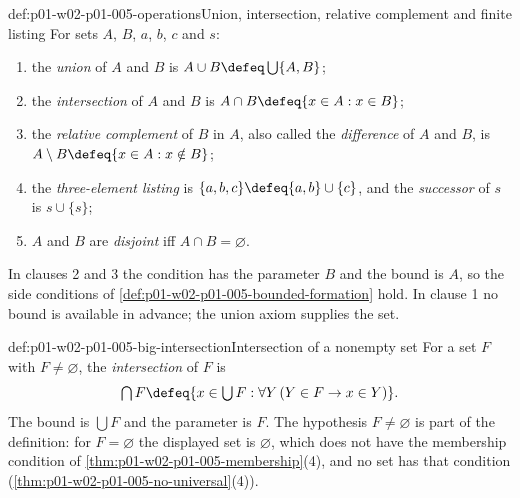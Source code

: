 \begin{hbdefinition}{def:p01-w02-p01-005-operations}{Union, intersection, relative complement and finite listing}
For sets \(A\), \(B\), \(a\), \(b\), \(c\) and \(s\):
\begin{enumerate}
  \item the \emph{union} of \(A\) and \(B\) is
        \(A\cup B\defeq\bigcup\{A,B\}\);
  \item the \emph{intersection} of \(A\) and \(B\) is
        \(A\cap B\defeq\{x\in A:x\in B\}\);
  \item the \emph{relative complement} of \(B\) in \(A\), also called the
        \emph{difference} of \(A\) and \(B\), is
        \(A\setminus B\defeq\{x\in A:x\notin B\}\);
  \item the \emph{three-element listing} is
        \(\{a,b,c\}\defeq\{a,b\}\cup\{c\}\), and the \emph{successor} of
        \(s\) is \(s\cup\{s\}\);
  \item \(A\) and \(B\) are \emph{disjoint} iff \(A\cap B=\varnothing\).
\end{enumerate}
In clauses 2 and 3 the condition has the parameter \(B\) and the bound is
\(A\), so the side conditions of \cref{def:p01-w02-p01-005-bounded-formation}
hold. In clause 1 no bound is available in advance; the union axiom supplies
the set.
\end{hbdefinition}

\begin{hbdefinition}{def:p01-w02-p01-005-big-intersection}{Intersection of a nonempty set}
For a set \(F\) with \(F\neq\varnothing\), the \emph{intersection} of \(F\) is
\[
  \textstyle\bigcap F\defeq
  \{x\in\bigcup F:\forall Y\,(Y\in F\to x\in Y)\}.
\]
The bound is \(\bigcup F\) and the parameter is \(F\). The hypothesis
\(F\neq\varnothing\) is part of the definition: for \(F=\varnothing\) the
displayed set is \(\varnothing\), which does not have the membership condition
of \cref{thm:p01-w02-p01-005-membership}(4), and no set has that condition
(\cref{thm:p01-w02-p01-005-no-universal}(4)).
\end{hbdefinition}


